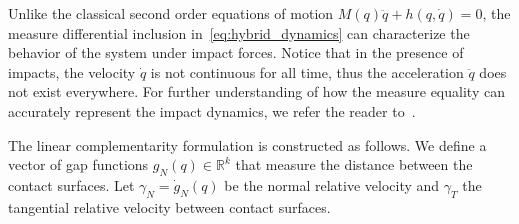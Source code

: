 \begin{rem}
  Unlike the classical second order equations of motion $M(q) \ddot{q} + h(q,
  \dot{q}) = 0$, the measure differential inclusion
  in~\eqref{eq:hybrid_dynamics} can characterize the behavior of the system
  under impact forces. Notice that in the presence of impacts, the velocity
  $\dot{q}$ is not continuous for all time, thus the acceleration $\ddot{q}$
  does not exist everywhere. For further understanding of how the measure
  equality can accurately represent the impact dynamics, we refer the reader
  to~\cite{moreau1988unilateral}.
\end{rem}
%
The linear complementarity formulation is constructed as follows. We define a
vector of gap functions $g_N(q) \in \mathbb{R}^{k}$ that measure the distance
between the contact surfaces. 
%
Let $\gamma_N = \dot{g}_N(q)$ be the normal relative velocity and
$\gamma_T$ the tangential relative velocity between contact surfaces.
%
